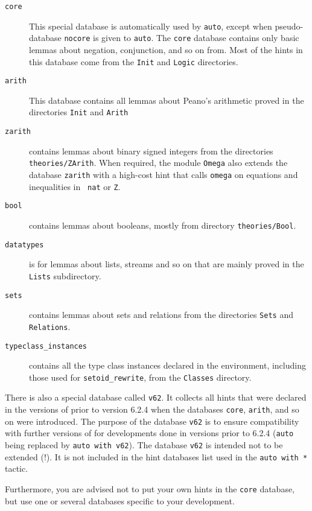 \begin{coq_example*}
\begin{description}
\item[\tt core] This special database is automatically used by
  \texttt{auto}, except when pseudo-database \texttt{nocore} is
  given to \texttt{auto}. The \texttt{core} database contains
  only basic lemmas about negation,
  conjunction, and so on from. Most of the hints in this database come
  from the \texttt{Init} and \texttt{Logic} directories.

\item[\tt arith] This database contains all lemmas about Peano's
  arithmetic proved in the directories \texttt{Init} and
  \texttt{Arith}

\item[\tt zarith] contains lemmas about binary signed integers from
  the directories \texttt{theories/ZArith}. When required, the module
  {\tt Omega} also extends the database {\tt zarith} with a high-cost
  hint that calls {\tt omega} on equations and inequalities in {\tt
  nat} or {\tt Z}.

\item[\tt bool] contains lemmas about booleans, mostly from directory
  \texttt{theories/Bool}.

\item[\tt datatypes] is for lemmas about lists, streams and so on that
  are mainly proved in the \texttt{Lists} subdirectory.

\item[\tt sets] contains lemmas about sets and relations from the
  directories \texttt{Sets} and \texttt{Relations}.

\item[\tt typeclass\_instances] contains all the type class instances
  declared in the environment, including those used for \texttt{setoid\_rewrite},
  from the \texttt{Classes} directory.
\end{description}

There is also a special database called {\tt v62}. It collects all
hints that were declared in the versions of {\Coq} prior to version
6.2.4 when the databases {\tt core}, {\tt arith}, and so on were
introduced.  The purpose of the database {\tt v62} is to ensure
compatibility with further versions of {\Coq} for developments done in
versions prior to 6.2.4 ({\tt auto} being replaced by {\tt auto with v62}).
The database {\tt v62} is intended not to be extended (!). It is not
included in the hint databases list used in the {\tt auto with *} tactic.

Furthermore, you are advised not to put your own hints in the
{\tt core} database, but use one or several databases specific to your
development.


\end{coq_example*}
